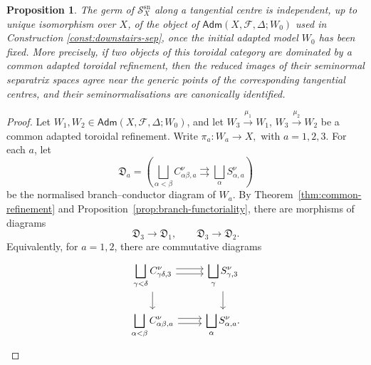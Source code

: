 \documentclass[11pt]{amsart}
\numberwithin{equation}{section}
\theoremstyle{plain}
\newtheorem{Proposition}[Theorem]{Proposition}
\theoremstyle{definition}
\newcommand{\sn}{\mathrm{sn}}
\newcommand{\Adm}{\mathsf{Adm}}
\newcommand{\cF}{\mathcal F}
\newcommand{\sS}{\mathscr S}
\begin{document}
 


\begin{Proposition}
\label{prop:downstairs-canonical}
The germ of $\sS_X^{\sn}$ along a tangential centre is independent, up to unique isomorphism over $X$, of the object of $\Adm(X,\cF,\Delta;W_0)$ used in Construction \ref{const:downstairs-sep}, once the initial adapted model $W_0$ has been fixed.  More precisely, if two objects of this toroidal category are dominated by a common adapted toroidal refinement, then the reduced images of their seminormal separatrix spaces agree near the generic points of the corresponding tangential centres, and their seminormalisations are canonically identified.
\end{Proposition}

\begin{proof}
Let \(W_1,W_2\in\Adm(X,\cF,\Delta;W_0)\), and let
$
W_3 \xrightarrow{\mu_1} W_1
 $, $
W_3 \xrightarrow{\mu_2} W_2
$
be a common adapted toroidal refinement. Write
$
\pi_a:W_a\longrightarrow X,
 $ with $ a=1,2,3.
$
For each \(a\), let
\[
\mathfrak D_a=
\left(
\bigsqcup_{\alpha<\beta} C_{\alpha\beta,a}^{\nu}
\rightrightarrows
\bigsqcup_{\alpha} S_{\alpha,a}^{\nu}
\right)
\]
be the normalised branch--conductor diagram of \(W_a\). By Theorem~\ref{thm:common-refinement} and Proposition~\ref{prop:branch-functoriality}, there are morphisms of diagrams
\[
\mathfrak D_3\longrightarrow \mathfrak D_1,
\qquad
\mathfrak D_3\longrightarrow \mathfrak D_2.
\]
Equivalently, for \(a=1,2\), there are commutative diagrams
\[
\begin{tikzcd}
\displaystyle\bigsqcup_{\gamma<\delta} C_{\gamma\delta,3}^{\nu}
\arrow[r,shift left=.6ex] \arrow[r,shift right=.6ex] \arrow[d] &
\displaystyle\bigsqcup_{\gamma} S_{\gamma,3}^{\nu}
\arrow[d]\\
\displaystyle\bigsqcup_{\alpha<\beta} C_{\alpha\beta,a}^{\nu}
\arrow[r,shift left=.6ex] \arrow[r,shift right=.6ex] &
\displaystyle\bigsqcup_{\alpha} S_{\alpha,a}^{\nu}.
\end{tikzcd}
\]


\end{proof}
\end{document}

